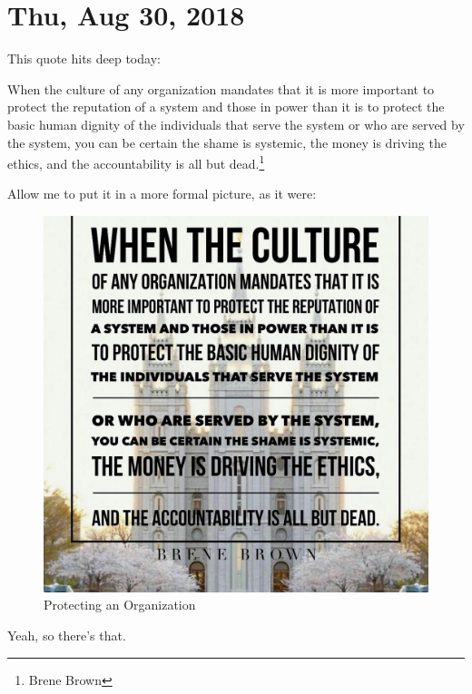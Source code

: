 \section{Thu, Aug 30, 2018}

This quote hits deep today:

\begin{displayquote}
When the culture of any organization mandates that it is more important to protect
the reputation of a system and those in power than it is to protect the basic human
dignity of the individuals that serve the system or who are served by the system, you
can be certain the shame is systemic, the money is driving the ethics, and the
accountability is all but dead.\footnote{Brene Brown}
\end{displayquote}

Allow me to put it in a more formal picture, as it were:

\begin{figure}[h!]
  \centering
  \includegraphics[width=1\linewidth]{2018/images/protect.jpg}
  \caption{Protecting an Organization}
  \label{fig:protect}
\end{figure}

Yeah, so there's that.
